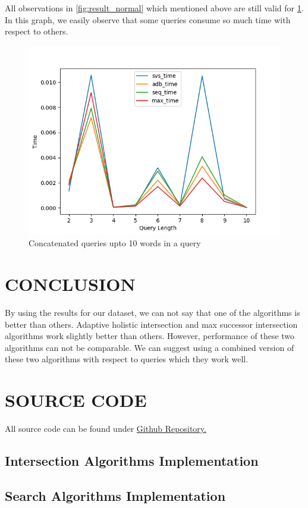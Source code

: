 \documentclass[paper=a4, fontsize=11pt]{scrartcl} %
\numberwithin{equation}{section} %
\numberwithin{figure}{section} %
\numberwithin{table}{section} %
\begin{document}
All observations in \ref{fig:result_normal} which mentioned above are still valid for \ref{fig:result_50}. In this graph, we easily observe that some queries consume so much time with respect to others.


\begin{figure}[H]
   \includegraphics[width=\textwidth]{result_50}
  \caption{ Concatenated queries upto 10 words in a query}
  \label{fig:result_50}
\end{figure}



\section{CONCLUSION}
By using the results for our dataset, we can not say that one of the algorithms is better than others. Adaptive holistic intersection and max successor intersection algorithms work slightly better than others. However, performance of these two algorithms can not be comparable. We  can suggest using a combined version of these two algorithms with respect to queries which they work well.


\newpage
\section{SOURCE CODE}

All source code can be found under  \href{https://github.com/ozgurgundogan/Efficient-set-intersection-for-inverted-indexing}{Github Repository.}


\subsection{Intersection Algorithms Implementation}


\newpage
\subsection{Search Algorithms Implementation}

\end{document}

